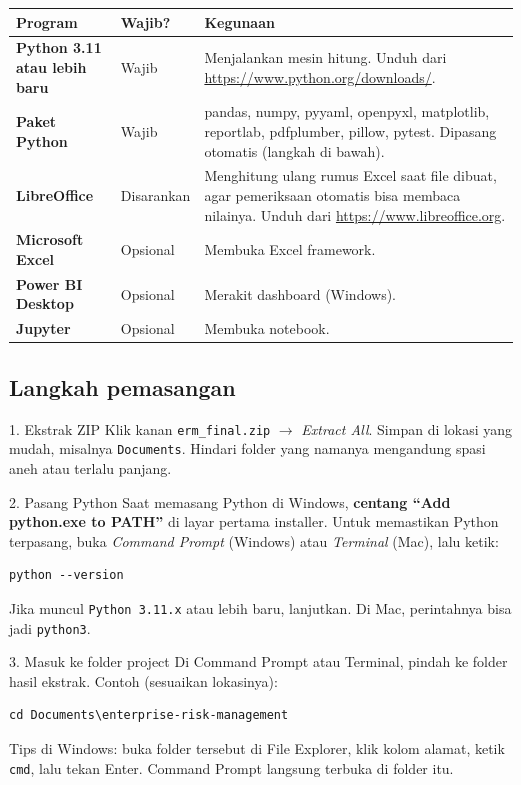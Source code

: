 \documentclass[11pt,a4paper]{article}
\newcommand{\file}[1]{\texttt{\small #1}}
\begin{document}
\begin{center}
\begin{tabularx}{\linewidth}{>{\bfseries}p{3.4cm}>{\raggedright\arraybackslash}p{2.3cm}X}
\toprule
Program & Wajib? & Kegunaan \\
\midrule
Python 3.11 atau lebih baru & Wajib & Menjalankan mesin hitung. Unduh dari \url{https://www.python.org/downloads/}. \\
Paket Python & Wajib & pandas, numpy, pyyaml, openpyxl, matplotlib, reportlab, pdfplumber, pillow, pytest. Dipasang otomatis (langkah di bawah). \\
LibreOffice & Disarankan & Menghitung ulang rumus Excel saat file dibuat, agar pemeriksaan otomatis bisa membaca nilainya. Unduh dari \url{https://www.libreoffice.org}. \\
Microsoft Excel & Opsional & Membuka Excel framework. \\
Power BI Desktop & Opsional & Merakit dashboard (Windows). \\
Jupyter & Opsional & Membuka notebook. \\
\bottomrule
\end{tabularx}
\end{center}

\subsection{Langkah pemasangan}

\begin{stepbox}{1. Ekstrak ZIP}
Klik kanan \file{erm\_\allowbreak{}final.zip} $\rightarrow$ \emph{Extract All}. Simpan di lokasi yang mudah, misalnya \file{Documents}. Hindari folder yang namanya mengandung spasi aneh atau terlalu panjang.
\end{stepbox}

\begin{stepbox}{2. Pasang Python}
Saat memasang Python di Windows, \textbf{centang ``Add python.exe to PATH''} di layar pertama installer. Untuk memastikan Python terpasang, buka \emph{Command Prompt} (Windows) atau \emph{Terminal} (Mac), lalu ketik:
\begin{lstlisting}
python --version
\end{lstlisting}
Jika muncul \texttt{Python 3.11.x} atau lebih baru, lanjutkan. Di Mac, perintahnya bisa jadi \texttt{python3}.
\end{stepbox}

\begin{stepbox}{3. Masuk ke folder project}
Di Command Prompt atau Terminal, pindah ke folder hasil ekstrak. Contoh (sesuaikan lokasinya):
\begin{lstlisting}
cd Documents\enterprise-risk-management
\end{lstlisting}
Tips di Windows: buka folder tersebut di File Explorer, klik kolom alamat, ketik \texttt{cmd}, lalu tekan Enter. Command Prompt langsung terbuka di folder itu.
\end{stepbox}
\end{document}
